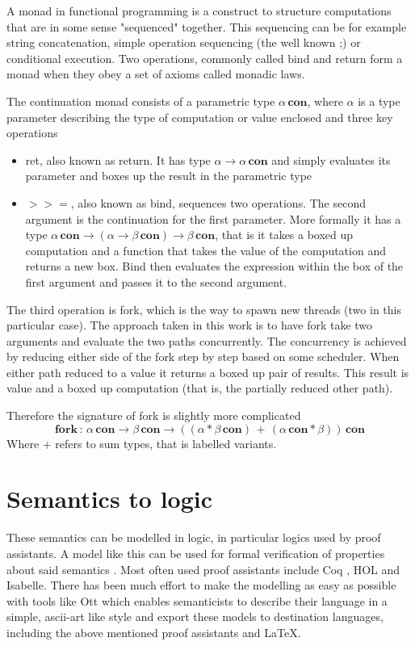 \documentclass[12pt,twoside,notitlepage]{report}
\begin{document}
A monad\cite{hoareetal2001tackling} in functional programming is a construct to structure computations that are in some sense "sequenced" together. This sequencing can be for example string concatenation, simple operation sequencing (the well known ;) or conditional execution. Two operations, commonly called bind and return form a monad when they obey a set of axioms called monadic laws.


The continuation monad consists of a parametric type $ \alpha \, \textbf{con} $, where $ \alpha $ is a type parameter describing the type of computation or value enclosed and three key operations 
\begin{itemize}
\item{ret, also known as return. It has type $ \alpha \rightarrow \alpha \, \textbf{con} $ and simply evaluates its parameter and boxes up the result in the parametric type}
\item{$>>=$, also known as bind, sequences two operations. The second argument is the continuation for the first parameter. More formally it has a type $ \alpha \, \textbf{con} \rightarrow ( \alpha \rightarrow \beta \, \textbf{con}) \rightarrow \beta \, \textbf{con}  $, that is it takes a boxed up computation and a function that takes the value of the computation and returns a new box. Bind then evaluates the expression within the box of the first argument and passes it to the second argument.}

\end{itemize}

The third operation is fork, which is the way to spawn new threads (two in this particular case). The approach taken in this work is to have fork take two arguments and evaluate the two paths concurrently. The concurrency is achieved by reducing either side of the fork step by step based on some scheduler. When either path reduced to a value it returns a boxed up pair of results. This result is value and a boxed up computation (that is, the partially reduced other path).

Therefore the signature of fork is slightly more complicated
\[ \textbf{fork} \, : \, \alpha \, \textbf{con} \rightarrow \beta \, \textbf{con} \rightarrow ((\alpha *  \beta \, \textbf{con}) \, + \, ( \alpha \, \textbf{con} * \beta) ) \, \textbf{con} \]
Where $ + $ refers to sum types, that is labelled variants.  

\section{Semantics to logic}
These semantics can be modelled in logic, in particular logics used by proof assistants. A model like this can be used for formal verification of properties about said semantics \cite{benton2008mechanized,blazy2009mechanized, blazy2006formal, leroy2009formal}. Most often used proof assistants include Coq \cite{Coq}, HOL and Isabelle. There has been much effort to make the modelling as easy as possible with tools like Ott\cite{Ott} which enables semanticists to describe their language in a simple, ascii-art like style and export these models to destination languages, including the above mentioned proof assistants and \LaTeX.
\end{document}
